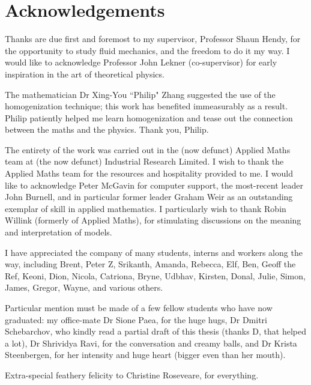 \documentclass[12pt, a4paper, twoside, openright]{book}
\begin{document}
\chapter*{Acknowledgements}\label{C:ack}

Thanks are due first and foremost to my supervisor, Professor Shaun Hendy, for the opportunity to study fluid mechanics, and the freedom to do it my way.
I would like to acknowledge Professor John Lekner (co-supervisor) for early inspiration in the art of theoretical physics.

The mathematician Dr Xing-You ``Philip" Zhang suggested the use of the homogenization technique; this work has benefited immeasurably as a result.  Philip patiently helped me learn homogenization and tease out the connection between the maths and the physics.  Thank you, Philip.

The entirety of the work was carried out in the (now defunct) Applied Maths team at (the now defunct) Industrial Research Limited.  I wish to thank the Applied Maths team for the resources and hospitality provided to me. I would like to acknowledge Peter McGavin for computer support, the most-recent leader John Burnell, and in particular former leader Graham Weir as an outstanding exemplar of skill in applied mathematics. 
I particularly wish to thank Robin Willink (formerly of Applied Maths), for stimulating discussions on the meaning and interpretation of models.

I have appreciated the company of many students, interns and workers along the way, including Brent, Peter Z, Srikanth, Amanda, Rebecca, Elf, Ben, Geoff the Ref, Keoni, Dion, Nicola, Catriona, Bryne, Udbhav, Kirsten, Donal, Julie, Simon, James, Gregor, Wayne, and various others.

\clearpage
Particular mention must be made of a few fellow students who have now graduated:  my office-mate Dr Sione Paea, for the huge hugs, Dr Dmitri Schebarchov, who kindly read a partial draft of this thesis (thanks D, that helped a lot), Dr Shrividya Ravi, for the conversation and creamy balls, and Dr Krista Steenbergen, for her intensity and huge heart (bigger even than her mouth).

Extra-special feathery felicity to Christine Roseveare, for everything.
\end{document}
